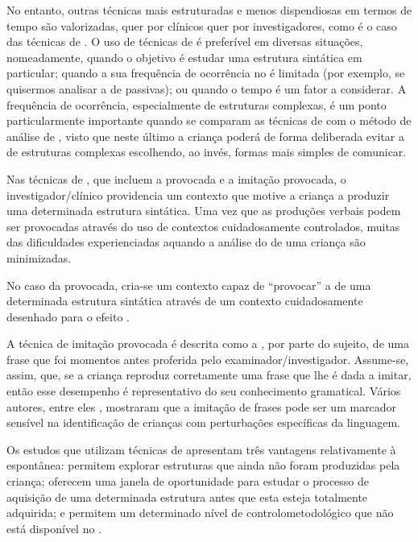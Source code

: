 \documentclass[output=paper]{LSP/langsci}
\begin{document}
No entanto, outras técnicas mais estruturadas e menos dispendiosas em termos de tempo são valorizadas, quer por clínicos quer por investigadores, como é o caso das técnicas de . O uso de técnicas de  é preferível em diversas situações, nomeadamente, quando o objetivo é estudar uma estrutura sintática em particular; quando a sua frequência de ocorrência no  é limitada (por exemplo, se quisermos analisar a  de passivas); ou quando o tempo é um fator a considerar. A frequência de ocorrência, especialmente de estruturas complexas, é um ponto particularmente importante quando se comparam as técnicas de  com o método de análise de , visto que neste último a criança poderá de forma deliberada  evitar a  de estruturas complexas escolhendo, ao invés, formas mais simples de comunicar.

Nas técnicas de , que incluem a  provocada e a imitação provocada, o investigador/clínico providencia um contexto que motive a criança a produzir uma determinada estrutura sintática. Uma vez que as produções verbais podem ser provocadas através do uso de contextos cuidadosamente controlados, muitas das dificuldades experienciadas aquando a análise do  de uma criança são minimizadas. 

No caso da  provocada, cria-se um contexto capaz de ``provocar'' a  de uma determinada estrutura sintática através de um contexto cuidadosamente desenhado para o efeito \citep{thornton1998}.

A técnica de imitação provocada é descrita como a , por parte do sujeito, de uma frase que foi momentos antes proferida pelo examinador/investigador. Assume-se, assim, que, se a criança reproduz corretamente uma frase que lhe é dada a imitar, então esse desempenho é representativo do seu conhecimento gramatical. Vários autores, entre eles \cite{contiramsden_etal2001}, mostraram que a imitação de frases pode ser um marcador sensível na identificação de crianças com perturbações específicas da linguagem. 

Os estudos que utilizam técnicas de  apresentam três vantagens relativamente à  espontânea: permitem explorar estruturas que ainda não foram produzidas pela criança; oferecem uma janela de oportunidade para estudar o processo de aquisição de uma determinada estrutura antes que esta esteja totalmente adquirida; e permitem um determinado nível de controlo\largerpage metodológico que não está disponível no  \citep{hirshpasekgolinkoff1996}.
\end{document}
